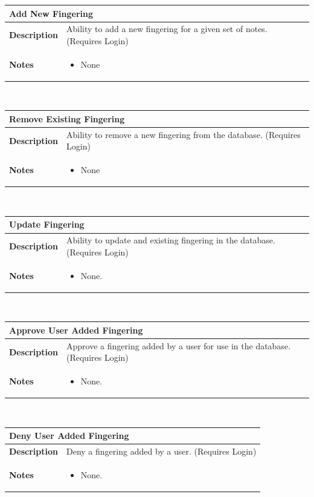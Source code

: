 \documentclass[12pt,english]{article}
\providecommand{\tabularnewline}{\\}
\begin{document}
\begin{tabular}{|p{3cm}|p{13cm}|}
\hline 
\multicolumn{2}{|l|}{\textbf{Add New Fingering}}\tabularnewline
\hline 
\textbf{Description}  & Ability to add a new fingering for a given set of notes. (Requires
Login) \tabularnewline
\hline 
\textbf{Notes}  & \begin{itemize}
\item None \end{itemize}
\tabularnewline
\hline 
\end{tabular}\\[0.5cm] %
\begin{tabular}{|p{3cm}|p{13cm}|}
\hline 
\multicolumn{2}{|l|}{\textbf{Remove Existing Fingering}}\tabularnewline
\hline 
\textbf{Description}  & Ability to remove a new fingering from the database. (Requires Login) \tabularnewline
\hline 
\textbf{Notes}  & \begin{itemize}
\item None \end{itemize}
\tabularnewline
\hline 
\end{tabular}\\[0.5cm] %
\begin{tabular}{|p{3cm}|p{13cm}|}
\hline 
\multicolumn{2}{|l|}{\textbf{Update Fingering}}\tabularnewline
\hline 
\textbf{Description}  & Ability to update and existing fingering in the database. (Requires
Login) \tabularnewline
\hline 
\textbf{Notes}  & \begin{itemize}
\item None. \end{itemize}
\tabularnewline
\hline 
\end{tabular}\\[0.5cm] %
\begin{tabular}{|p{3cm}|p{13cm}|}
\hline 
\multicolumn{2}{|l|}{\textbf{Approve User Added Fingering}}\tabularnewline
\hline 
\textbf{Description}  & Approve a fingering added by a user for use in the database. (Requires
Login) \tabularnewline
\hline 
\textbf{Notes}  & \begin{itemize}
\item None. \end{itemize}
\tabularnewline
\hline 
\end{tabular}\\[0.5cm] %
\begin{tabular}{|p{3cm}|p{13cm}|}
\hline 
\multicolumn{2}{|l|}{\textbf{Deny User Added Fingering}}\tabularnewline
\hline 
\textbf{Description}  & Deny a fingering added by a user. (Requires Login) \tabularnewline
\hline 
\textbf{Notes}  & \begin{itemize}
\item None. \end{itemize}
\tabularnewline
\hline 
\end{tabular}\\[0.5cm] %
\end{document}
